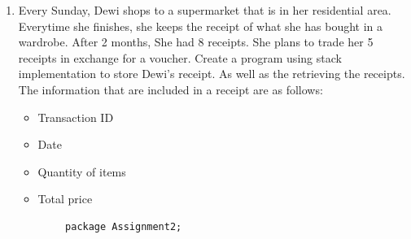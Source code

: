 \documentclass[12pt,titlepage]{article}
\begin{document}
\begin{enumerate}
\begin{verbatim}
            public void clear() {
                if (!isEmpty()) {
                    for (int i = top; i >= 0; i--) {
                        top--;
                    }
                    System.out.println("Stack is now empty");
                } else {
                    System.out.println("Failed ! Stack is still empty");
                }
            }
        }

    \end{verbatim}
    \begin{verbatim}
        package Assignment1;

        import java.util.Scanner;

        public class StackMain {
            public static void main(String[] args) {
                Scanner sc = new Scanner(System.in);

                System.out.print("Insert Sentence: ");
                String sentence = sc.nextLine(); 

                Stack stk = new Stack(sentence.length());
                for (int i = 0; i < sentence.length(); i++) {
                    stk.push(sentence.charAt(i));
                }
                stk.print();
                
                sc.close();
            }
        }

    \end{verbatim}
    \begin{verbatim}
        PS D:\Kuliah>  d:; cd 'd:\Kuliah'; & 'C:\Program Files\Java\jdk-18.0.2.1\bin\java.exe' '-XX:+ShowCodeDetailsInExceptionMessages' '-cp' 'C:\Users\G4CE-PC\AppData\Roaming\Code\User\workspaceStorage\ 80d97a47d24665dc0bce7ab1e048ecbd\redhat.java\jdt_ws\ Kuliah_28156aa7\bin' 'Assignment1.StackMain'    
        Insert Sentence: Politeknik Negeri Malang
        Result: 
        gnalaM iregeN kinketiloP
    \end{verbatim}
    \item Every Sunday, Dewi shops to a supermarket that is in her residential area. Everytime she finishes, she keeps the receipt of what she has bought in a wardrobe. After 2 months, She had 8 receipts. She plans to trade her 5 receipts in exchange for a voucher. Create a program using stack implementation to store Dewi’s receipt. As well as the retrieving the receipts. The information that are included in a receipt are as follows:
    \begin{itemize}
        \item Transaction ID
        \item Date
        \item Quantity of items
        \item Total price
    \end{itemize}
    \begin{verbatim}
        package Assignment2;


\end{verbatim}
\end{enumerate}
\end{document}
